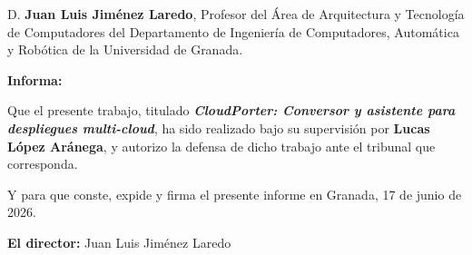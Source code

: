 \thispagestyle{empty}
\vspace*{2cm}

D. \textbf{Juan Luis Jiménez Laredo}, Profesor del Área de Arquitectura y Tecnología de
Computadores del Departamento de Ingeniería de Computadores, Automática y Robótica de la
Universidad de Granada.

\vspace{1cm}

\textbf{Informa:}

\vspace{0.5cm}

Que el presente trabajo, titulado \textbf{\textit{CloudPorter: Conversor y asistente para
despliegues multi-cloud}}, ha sido realizado bajo su supervisión por \textbf{Lucas López
Aránega}, y autorizo la defensa de dicho trabajo ante el tribunal que corresponda.

\vspace{0.5cm}

Y para que conste, expide y firma el presente informe en Granada, 17 de junio de 2026.

\vspace{2cm}

\textbf{El director:} Juan Luis Jiménez Laredo

\newpage
